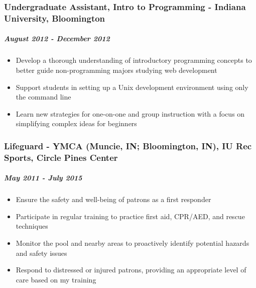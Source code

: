 \documentclass[11pt]{article}
\begin{document}
\subsubsection*{Undergraduate Assistant, Intro to Programming - Indiana University, Bloomington}
\label{sec:org171b907}
\subparagraph*{\emph{August 2012 - December 2012}}
\label{sec:org4f8b0b3}
\begin{itemize}
\item Develop a thorough understanding of introductory programming concepts to better guide non-programming majors studying web development
\item Support students in setting up a Unix development environment using only the command line
\item Learn new strategies for one-on-one and group instruction with a focus on simplifying complex ideas for beginners
\end{itemize}
\subsubsection*{Lifeguard - YMCA (Muncie, IN; Bloomington, IN), IU Rec Sports, Circle Pines Center}
\label{sec:orge9386d4}
\subparagraph*{May 2011 - July 2015}
\label{sec:org482e614}
\begin{itemize}
\item Ensure the safety and well-being of patrons as a first responder
\item Participate in regular training to practice first aid, CPR/AED, and
rescue techniques
\item Monitor the pool and nearby areas to proactively identify potential
hazards and safety issues
\item Respond to distressed or injured patrons, providing an appropriate
level of care based on my training
\end{itemize}
\end{document}
